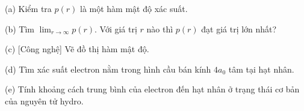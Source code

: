 \documentclass[12pt,a4paper]{article}
\begin{document}
(a) Kiểm tra $p(r)$ là một hàm mật độ xác suất.

(b) Tìm $\lim_{r\to\infty}p(r)$. Với giá trị $r$ nào thì $p(r)$ đạt giá trị lớn nhất?

(c) [Công nghệ] Vẽ đồ thị hàm mật độ.

(d) Tìm xác suất electron nằm trong hình cầu bán kính $4a_0$ tâm tại hạt nhân.

(e) Tính khoảng cách trung bình của electron đến hạt nhân ở trạng thái cơ bản của nguyên tử hydro.

\endgroup
\end{document}

